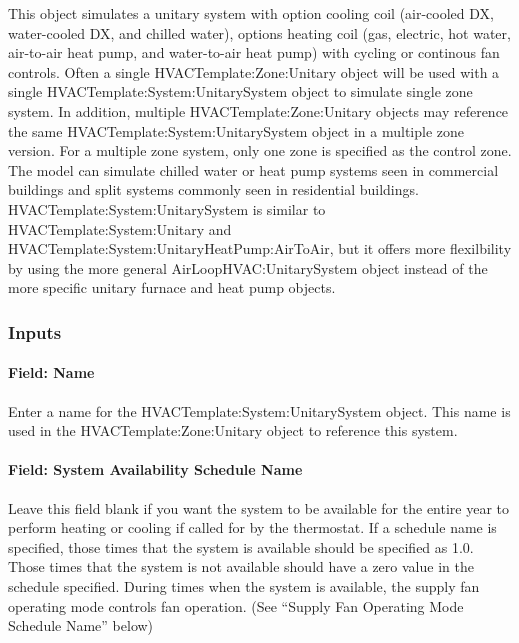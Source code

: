 This object simulates a unitary system with option cooling coil (air-cooled DX, water-cooled DX, and chilled water), options heating coil (gas, electric, hot water, air-to-air heat pump, and water-to-air heat pump) with cycling or continous fan controls. Often a single HVACTemplate:Zone:Unitary object will be used with a single HVACTemplate:System:UnitarySystem object to simulate single zone system. In addition, multiple HVACTemplate:Zone:Unitary objects may reference the same HVACTemplate:System:UnitarySystem object in a multiple zone version. For a multiple zone system, only one zone is specified as the control zone. The model can simulate chilled water or heat pump systems seen in commercial buildings and split systems commonly seen in residential buildings. HVACTemplate:System:UnitarySystem is similar to HVACTemplate:System:Unitary and HVACTemplate:System:UnitaryHeatPump:AirToAir, but it offers more flexilbility by using the more general AirLoopHVAC:UnitarySystem object instead of the more specific unitary furnace and heat pump objects.

\subsubsection{Inputs}\label{inputs-2016-06-16-1621}

\paragraph{Field: Name}\label{field-name-4-013}

Enter a name for the HVACTemplate:System:UnitarySystem object. This name is used in the HVACTemplate:Zone:Unitary object to reference this system.

\paragraph{Field: System Availability Schedule Name}\label{field-system-availability-schedule-name-9}

Leave this field blank if you want the system to be available for the entire year to perform heating or cooling if called for by the thermostat. If a schedule name is specified, those times that the system is available should be specified as 1.0. Those times that the system is not available should have a zero value in the schedule specified. During times when the system is available, the supply fan operating mode controls fan operation. (See ``Supply Fan Operating Mode Schedule Name'' below)

